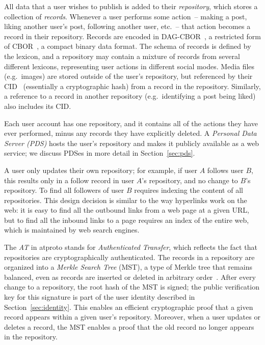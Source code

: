 \documentclass[sigconf]{acmart}
\begin{document}
All data that a user wishes to publish is added to their \emph{repository}, which stores a collection of \emph{records}.
Whenever a user performs some action~-- making a post, liking another user's post, following another user, etc.~-- that action becomes a record in their repository.
Records are encoded in DAG-CBOR~\cite{DAG-CBOR}, a restricted form of CBOR~\cite{CBOR}, a compact binary data format.
The schema of records is defined by the lexicon, and a repository may contain a mixture of records from several different lexicons, representing user actions in different social modes.
Media files (e.g.\ images) are stored outside of the user's repository, but referenced by their CID~\cite{CID} (essentially a cryptographic hash) from a record in the repository.
Similarly, a reference to a record in another repository (e.g.\ identifying a post being liked) also includes its CID.

Each user account has one repository, and it contains all of the actions they have ever performed, minus any records they have explicitly deleted.
A \emph{Personal Data Server (PDS)} hosts the user's repository and makes it publicly available as a web service; we discuss PDSes in more detail in Section~\ref{sec:pds}.

A user only updates their own repository; for example, if user $A$ follows user $B$, this results only in a follow record in user $A$'s repository, and no change to $B$'s repository.
To find all followers of user $B$ requires indexing the content of all repositories.
This design decision is similar to the way hyperlinks work on the web: it is easy to find all the outbound links from a web page at a given URL, but to find all the inbound links to a page requires an index of the entire web, which is maintained by web search engines.

The \emph{AT} in atproto stands for \emph{Authenticated Transfer}, which reflects the fact that repositories are cryptographically authenticated.
The records in a repository are organized into a \emph{Merkle Search Tree} (MST), a type of Merkle tree that remains balanced, even as records are inserted or deleted in arbitrary order~\cite{Auvolat:2019}.
After every change to a repository, the root hash of the MST is signed; the public verification key for this signature is part of the user identity described in Section~\ref{sec:identity}.
This enables an efficient cryptographic proof that a given record appears within a given user's repository.
Moreover, when a user updates or deletes a record, the MST enables a proof that the old record no longer appears in the repository.
\end{document}
